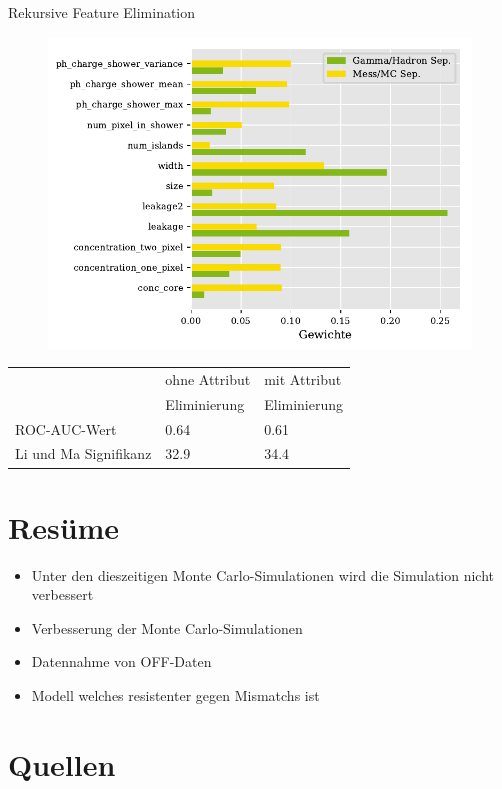 \documentclass[aspectratio=1610, professionalfonts, 9pt]{beamer}
\begin{document}
\begin{frame}{Rekursive Feature Elimination}
  \begin{figure}
	\centering
	\includegraphics[height=0.8\textheight]{./Plots/feature_elemination.pdf}
  \end{figure}
\end{frame}

\begin{frame}
  \begin{table}
	\centering
	\begin{tabular}{l s s}
	  \toprule
	  & ohne Attribut & mit Attribut \\
	  & Eliminierung  & Eliminierung \\
	  \cmidrule(r){2-3}
	  ROC-AUC-Wert            & \num{0.64} & \num{0.61} \\
	  Li und Ma Signifikanz   & \SI{32.9}{\sigma} & \SI{34.4}{\sigma} \\
	  \bottomrule
	\end{tabular}
  \end{table}
\end{frame}

\section{Resüme}
\begin{frame}
  \begin{itemize}
	\item<1-> Unter den dieszeitigen Monte Carlo-Simulationen wird die Simulation nicht verbessert 
	\item<2-> Verbesserung der Monte Carlo-Simulationen 
	\item<3-> Datennahme von OFF-Daten
	\item<4-> Modell welches resistenter gegen Mismatchs ist
  \end{itemize}
\end{frame}

\section{Quellen}
\begin{frame}
  \printbibliography
\end{frame}
\end{document}

